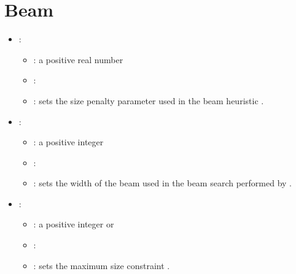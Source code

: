 \section{Beam}


\begin{itemize}
    \item {}:
           \begin{itemize}
                \item \optionPossibleValues{}: a positive real number
                \item \optionDefaultValue{}: 
                \item \optionDescrption{}:  sets the size penalty parameter used in the beam heuristic \cite{Kocev07a:proc}.
           \end{itemize}
    \item {}:
           \begin{itemize}
                \item \optionPossibleValues{}: a positive integer
                \item \optionDefaultValue{}: 
                \item \optionDescrption{}:  sets the width of the beam used in the beam search performed by \clus{} \cite{Kocev07a:proc}.
           \end{itemize}
    \item {}:
           \begin{itemize}
                \item \optionPossibleValues{}: a positive integer or 
                \item \optionDefaultValue{}: 
                \item \optionDescrption{}:  sets the maximum size constraint \cite{Kocev07a:proc}.
           \end{itemize}

\end{itemize}
